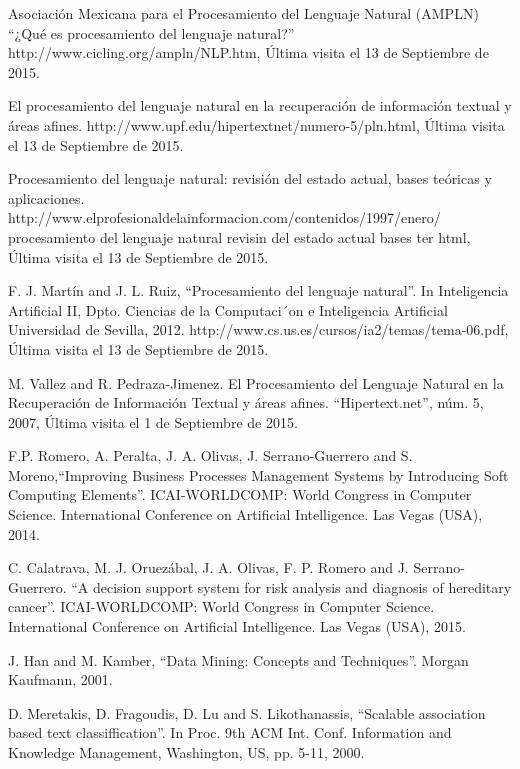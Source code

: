 \documentclass[runningheads,a4paper]{llncs}
\theoremstyle{break}
\begin{document}
\begin{thebibliography}{5}
Asociación Mexicana para el Procesamiento del Lenguaje Natural (AMPLN) ``¿Qué es procesamiento del lenguaje natural?'' http://www.cicling.org/ampln/NLP.htm, Última visita el 13 de Septiembre de 2015.

El procesamiento del lenguaje natural en la recuperación de información textual y áreas afines. http://www.upf.edu/hipertextnet/numero-5/pln.html, Última visita el 13 de Septiembre de 2015.

Procesamiento del lenguaje natural: revisión del estado actual, bases teóricas y aplicaciones. http://www.elprofesionaldelainformacion.com/contenidos/1997/enero/ procesamiento del lenguaje natural revisin del estado actual bases ter html, Última visita el 13 de Septiembre de 2015.

F. J. Martín and J. L. Ruiz, ``Procesamiento del lenguaje natural''. In Inteligencia Artificial II, Dpto. Ciencias de la Computaci´on e Inteligencia Artificial Universidad de Sevilla, 2012. http://www.cs.us.es/cursos/ia2/temas/tema-06.pdf, Última visita el 13 de Septiembre de 2015.

M. Vallez and R. Pedraza-Jimenez. El Procesamiento del Lenguaje Natural en la Recuperación de Información Textual y áreas afines. ``Hipertext.net'', núm. 5, 2007, Última visita el 1 de Septiembre de 2015.

F.P. Romero, A. Peralta, J. A. Olivas, J. Serrano-Guerrero and S. Moreno,``Improving Business Processes Management Systems by Introducing Soft Computing Elements''. ICAI-WORLDCOMP: World Congress in Computer Science. International Conference on Artificial Intelligence. Las Vegas (USA), 2014.

C. Calatrava, M. J. Oruezábal, J. A. Olivas, F. P. Romero and J. Serrano-Guerrero. ``A decision support system for risk analysis and diagnosis of hereditary cancer''. ICAI-WORLDCOMP: World Congress in Computer Science. International Conference on Artificial Intelligence. Las Vegas (USA), 2015.
 
J. Han and M. Kamber, ``Data Mining: Concepts and Techniques''. Morgan Kaufmann, 2001.

D. Meretakis, D. Fragoudis, D. Lu and S. Likothanassis, ``Scalable association based text classiffication''. In Proc. 9th ACM Int. Conf. Information and Knowledge Management, Washington, US, pp. 5-11, 2000.
\end{thebibliography}
\end{document}

